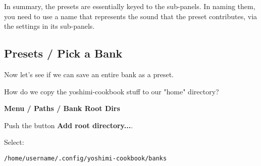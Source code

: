    In summary, the presets are essentially keyed to the sub-panels.
   In naming them, you need to use a name that represents the sound that the
   preset contributes, via the settings in its sub-panels.

\subsection{Presets / Pick a Bank}
\label{subsec:presets_pick_a_bank}

   Now let's see if we can save an entire bank as a preset.

   How do we copy the yoshimi-cookbook stuff to our "home" directory?

   \textbf{Menu / Paths / Bank Root Dirs}

   Push the button \textbf{Add root directory...}.

   Select:

   \texttt{/home/username/.config/yoshimi-cookbook/banks}

